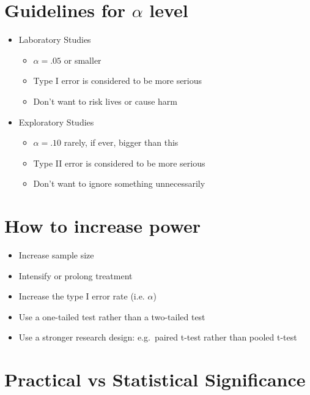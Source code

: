 \documentclass[12pt]{article}
\begin{document}
\section{\texorpdfstring{Guidelines for \(\alpha\)
level}{Guidelines for \textbackslash{}alpha level}}\label{guidelines-for-alpha-level}

\begin{itemize}
\itemsep1pt\parskip0pt
\item
  Laboratory Studies

  \begin{itemize}
  \itemsep1pt\parskip0pt
  \item
    \(\alpha = .05\) or smaller
  \item
    Type I error is considered to be more serious
  \item
    Don't want to risk lives or cause harm
  \end{itemize}
\item
  Exploratory Studies

  \begin{itemize}
  \itemsep1pt\parskip0pt
  \item
    \(\alpha = .10\) rarely, if ever, bigger than this
  \item
    Type II error is considered to be more serious
  \item
    Don't want to ignore something unnecessarily
  \end{itemize}
\end{itemize}

\section{How to increase power}\label{how-to-increase-power}

\begin{itemize}
\itemsep1pt\parskip0pt
\item
  Increase sample size
\item
  Intensify or prolong treatment
\item
  Increase the type I error rate (i.e. \(\alpha\))
\item
  Use a one-tailed test rather than a two-tailed test
\item
  Use a stronger research design: e.g.~paired t-test rather than pooled
  t-test
\end{itemize}

\section{Practical vs Statistical
Significance}\label{practical-vs-statistical-significance}
\end{document}
